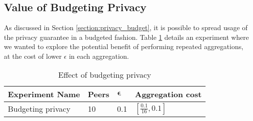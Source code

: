 
\subsection{Value of Budgeting Privacy}
 
As discussed in Section \ref{section:privacy_budget}, it is possible to spread usage of the privacy guarantee in a budgeted fashion. Table \ref{tab:experiments_budgeting_privacy} details an experiment where we wanted to explore the potential benefit of performing repeated aggregations, at the cost of lower $\epsilon$ in each aggregation.

\begin{table}[h]
	\centering	
	\begin{tabular}{|l|l|l|l|}
		{\bf Experiment Name} & {\bf Peers} & $\boldsymbol{\epsilon}$ & {\bf Aggregation cost}        \\
		\hline
		Budgeting privacy & 10    & 0.1     & $[\frac{0.1}{16}, 0.1]$
	\end{tabular}
	\caption{Effect of budgeting privacy}
	\label{tab:experiments_budgeting_privacy}
\end{table}
